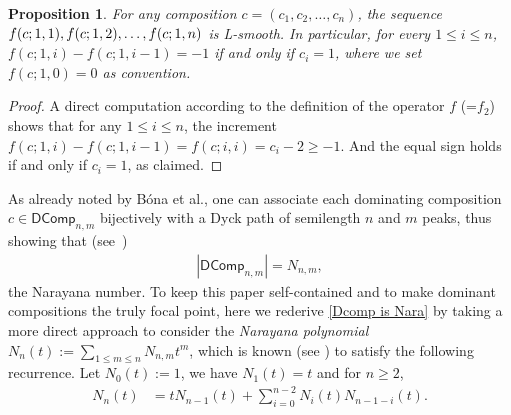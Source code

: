 \documentclass[reqno]{amsart}
\numberwithin{equation}{section}
\newtheorem{proposition}[theorem]{Proposition}
\theoremstyle{definition}
\theoremstyle{named}
\def\DComp{\mathsf{DComp}}
\begin{document}
\begin{proposition}\label{L-smooth}
For any composition $c=(c_1, c_2, \ldots, c_n)$, the sequence $f(c;1,1),\\f(c;1,2),\ldots,f(c;1,n)$ is L-smooth. In particular, for every $1\le i\le n$, $f(c;1,i)-f(c;1,i-1)=-1$ if and only if $c_i=1$, where we set $f(c;1,0)=0$ as convention.
\end{proposition}
\begin{proof}
A direct computation according to the definition of the operator $f$ (=$f_2$) shows that for any $1\le i\le n$, the increment $f(c;1,i)-f(c;1,i-1)=f(c;i,i)=c_i-2\ge -1$. And the equal sign holds if and only if $c_i=1$, as claimed.
\end{proof}

As already noted by B\'ona et al., one can associate each dominating composition $c\in\DComp_{n,m}$ bijectively with a Dyck path of semilength $n$ and $m$ peaks, thus showing that (see~\cite[Lemma~4.1]{BDL2022})
\begin{align}\label{Dcomp is Nara}
|\DComp_{n,m}|=N_{n,m},
\end{align}
the Narayana number. To keep this paper self-contained and to make dominant compositions the truly focal point, here we rederive \eqref{Dcomp is Nara} by taking a more direct approach to consider the {\it Narayana polynomial} $N_n(t):=\sum_{1\le m\le n}N_{n,m}t^m$, which is known (see \cite[Sect.~2.3]{Pet2015}) to satisfy the following recurrence. Let $N_0(t):=1$, we have $N_1(t)=t$ and for $n\ge 2$,
\begin{align}\label{rec:Narapoly}
N_n(t) &=tN_{n-1}(t)+\sum_{i=0}^{n-2} N_i(t)N_{n-1-i}(t).
\end{align}
\end{document}
